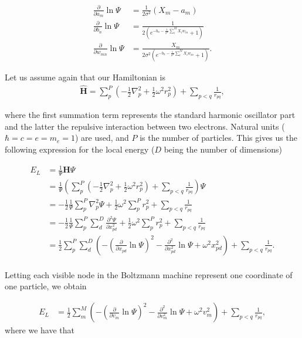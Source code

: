 \documentclass[%
oneside,                 %
final,                   %
10pt]{article}
\begin{document}
\begin{align}
	\frac{\partial }{\partial a_m} \ln\Psi
	&= 	\frac{1}{2\sigma^2} (X_m - a_m) \\
	\frac{\partial }{\partial b_n} \ln\Psi
	&=
	\frac{1}{2(e^{-b_n-\frac{1}{\sigma^2}\sum_i^M X_i w_{in}} + 1)} \\
	\frac{\partial }{\partial w_{mn}} \ln\Psi
	&= \frac{X_m}{2\sigma^2(e^{-b_n-\frac{1}{\sigma^2}\sum_i^M X_i w_{in}} + 1)}.
\end{align}

Let us assume again that our Hamiltonian is 
\begin{align}
	\hat{\mathbf{H}} = \sum_p^P (-\frac{1}{2}\nabla_p^2 + \frac{1}{2}\omega^2 r_p^2 ) + \sum_{p<q} \frac{1}{r_{pq}},
\end{align}

where the first summation term represents the standard harmonic
oscillator part and the latter the repulsive interaction between two
electrons. Natural units ($\hbar=c=e=m_e=1$) are used, and $P$ is the
number of particles. This gives us the following expression for the
local energy ($D$ being the number of dimensions)

\begin{align}
	E_L &= \frac{1}{\Psi} \mathbf{H} \Psi \\
	&= \frac{1}{\Psi} (\sum_p^P (-\frac{1}{2}\nabla_p^2 + \frac{1}{2}\omega^2 r_p^2 ) + \sum_{p<q} \frac{1}{r_{pq}}) \Psi \\
	&= -\frac{1}{2}\frac{1}{\Psi} \sum_p^P \nabla_p^2 \Psi 
	+ \frac{1}{2}\omega^2 \sum_p^P  r_p^2  + \sum_{p<q} \frac{1}{r_{pq}} \\
	&= -\frac{1}{2}\frac{1}{\Psi} \sum_p^P \sum_d^D \frac{\partial^2 \Psi}{\partial x_{pd}^2} + \frac{1}{2}\omega^2 \sum_p^P  r_p^2  + \sum_{p<q} \frac{1}{r_{pq}} \\
	&= \frac{1}{2} \sum_p^P \sum_d^D (-(\frac{\partial}{\partial x_{pd}} \ln\Psi)^2 -\frac{\partial^2}{\partial x_{pd}^2} \ln\Psi + \omega^2 x_{pd}^2)  + \sum_{p<q} \frac{1}{r_{pq}}. \\
\end{align}

Letting each visible node in the Boltzmann machine 
represent one coordinate of one particle, we obtain

\begin{align}
	E_L &=
	\frac{1}{2} \sum_m^M (-(\frac{\partial}{\partial v_m} \ln\Psi)^2 -\frac{\partial^2}{\partial v_m^2} \ln\Psi + \omega^2 v_m^2)  + \sum_{p<q} \frac{1}{r_{pq}},
\end{align}
where we have that
\end{document}
